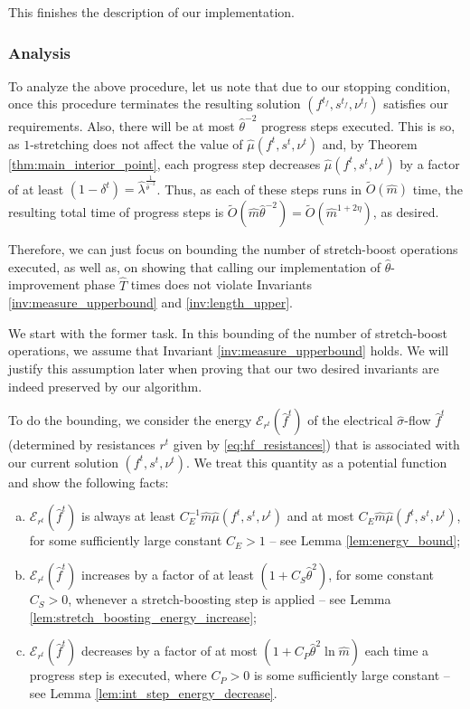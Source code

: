 \documentclass[11pt, letterpaper]{article}
\newcommand{\cendecrease}{C_{P}}
\newcommand{\cenergy}{C_{E}}
\newcommand{\cincrease}{C_{S}}
\newcommand{\tO}[1]{\widetilde{O}(#1)}
\newcommand{\hm}{\widehat{m}}
\newcommand{\hT}{\widehat{T}}
\newcommand{\energy}[2]{\mathcal{E}_{#1}(#2)}
\newcommand{\hmu}{\hat{\mu}}
\newcommand{\htheta}{\hat{\theta}}
\newcommand{\hlambda}{\hat{\lambda}}
\newcommand{\vnu}{\boldsymbol{\mathit{\nu}}}
\newcommand{\hvsigma}{\boldsymbol{\mathit{\hat{\sigma}}}}
\newcommand{\ff}{\boldsymbol{\mathit{f}}}
\newcommand{\hff}{\boldsymbol{\mathit{\hat{f}}}}
\newcommand{\rr}{\boldsymbol{\mathit{r}}}
\renewcommand{\ss}{\boldsymbol{\mathit{s}}}
\begin{document}
This finishes the description of our implementation. 

\subsubsection*{Analysis}

To analyze the above procedure, let us note that due to our stopping condition, once this procedure terminates the resulting solution $(\ff^{t_f},\ss^{t_f},\vnu^{t_f})$ satisfies our requirements. Also, there will be at most $\htheta^{-2}$ progress steps executed. This is so, as $1$-stretching does not affect the value of $\hmu(\ff^t,\ss^t,\vnu^t)$ and, by Theorem \ref{thm:main_interior_point}, each progress step decreases $\hmu(\ff^t,\ss^t,\vnu^t)$ by a factor of at least $(1-\delta^t)=\hlambda^{\frac{1}{\htheta^{-2}}}$. Thus, as each of these steps runs in $\tO{\hm}$ time, the resulting total time of progress steps is $\tO{\hm \htheta^{-2}}=\tO{\hm^{1+2\eta}}$, as desired.

Therefore, we can just focus on bounding the number of stretch-boost operations executed, as well as, on showing that calling our implementation of $\htheta$-improvement phase $\hT$ times does not violate Invariants \ref{inv:measure_upperbound} and \ref{inv:length_upper}. 

We start with the former task. In this bounding of the number of stretch-boost operations, we assume that Invariant \ref{inv:measure_upperbound} holds. We will justify this assumption later when proving that our two desired invariants are indeed preserved by our algorithm. 

To do the bounding, we consider the energy $\energy{\rr^t}{\hff^t}$ of the electrical $\hvsigma$-flow $\hff^t$ (determined by resistances $\rr^t$ given by \eqref{eq:hf_resistances}) that is associated with our current solution $(\ff^t,\ss^t,\vnu^t)$. We treat this quantity as a potential function and show the following facts:


\begin{enumerate}[(a)]\addtolength{\itemsep}{-.4\baselineskip}
\item $\energy{\rr^t}{\hff^t}$ is always at least $\cenergy^{-1}\hm \hmu(\ff^t,\ss^t,\vnu^t)$ and at most $\cenergy\hm \hmu(\ff^t,\ss^t,\vnu^t)$, for some sufficiently large constant $\cenergy>1$ -- see Lemma \ref{lem:energy_bound};\label{cond:stretch_tot_energy}
\item $\energy{\rr^t}{\hff^t}$ increases by a factor of at least $(1+\cincrease\htheta^2)$, for some constant $\cincrease>0$, whenever a stretch-boosting step is applied -- see Lemma \ref{lem:stretch_boosting_energy_increase};\label{cond:stretch_boosting_energy}
\item $\energy{\rr^t}{\hff^t}$ decreases by a factor of at most $(1+\cendecrease\htheta^2\ln \hm)$ each time a progress step is executed, where $\cendecrease>0$ is some sufficiently large constant -- see Lemma \ref{lem:int_step_energy_decrease}.\label{cond:stretch_progress_energy}
\end{enumerate}
\end{document}
